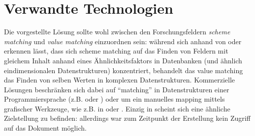 \documentclass[a4paper,10pt]{article}
\begin{document}
\section{Verwandte Technologien}
\label{sec:research}
Die vorgestellte Lösung sollte wohl zwischen den Forschungsfeldern \textit{scheme matching} und
\textit{value matching} einzuordnen sein: während sich anhand von \cite{rodrigues:scheme_matching_alma}
oder \cite{gou:source_xml} erkennen lässt, dass sich scheme matching auf das Finden von Feldern
mit gleichem Inhalt anhand eines Ähnlichkeitsfaktors in Datenbanken (und ähnlich eindimensionalen
Datenstrukturen) konzentriert, behandelt das value matching das Finden von selben Werten in komplexen
Datenstrukturen. Kommerzielle Lösungen beschränken sich dabei auf ``matching'' in Datenstrukturen
einer Programmiersprache (z.B. \cite{dozer:dozer} oder \cite{halterman:modelmapper}) oder um ein manuelles
mapping mittels grafischer Werkzeuge, wie z.B. in \cite{adverity:adverity} oder \cite{altova:mapforce}.\newline
Einzig in \cite{boettcher:data_mapping} scheint sich eine ähnliche Zielstellung zu befinden: allerdings war
zum Zeitpunkt der Erstellung kein Zugriff auf das Dokument möglich.
\end{document}
